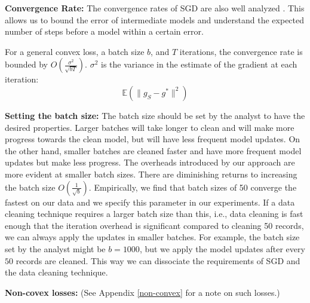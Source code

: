 \vspace{0.25em}

\noindent\textbf{ Convergence Rate: } The convergence rates of SGD are also well analyzed \cite{dekel2012optimal,bertsekas2011incremental,zhao2014stochastic}. 
This allows us to bound the error of intermediate models and understand the expected number of steps before a model within a certain error. 

\begin{proposition}
For a general convex loss, a batch size $b$, and $T$ iterations, the convergence rate is bounded by $O(\frac{\sigma^2}{\sqrt{bT}})$. 
$\sigma^2$ is the variance in the estimate of the gradient at each iteration:
\[
\mathbb{E}(\|g_S - g^*\|^2)
\]
\end{proposition}

\vspace{0.25em}

\noindent\textbf{ Setting the batch size: } The batch size should be set by the analyst to have the desired properties.
Larger batches will take longer to clean and will make more progress towards the clean model, but will have less frequent model updates.
On the other hand, smaller batches are cleaned faster and have more frequent model updates but make less progress.
The overheads introduced by our approach are more evident at smaller batch sizes.
There are diminishing returns to increasing the batch size $O(\frac{1}{\sqrt{b}})$.
Empirically, we find that batch sizes of 50 converge the fastest on our data and we specify this parameter in our experiments.
If a data cleaning technique requires a larger batch size than this, i.e., data cleaning is fast enough that the iteration overhead is significant compared to cleaning 50 records, we can always apply the updates in smaller batches.
For example, the batch size set by the analyst might be $b=1000$, but we apply the model updates after every $50$ records are cleaned.
This way we can dissociate the requirements of SGD and the data cleaning technique.

\vspace{0.5em}

\noindent\textbf{ Non-covex losses: } (See Appendix \ref{non-convex} for a note on such losses.)


